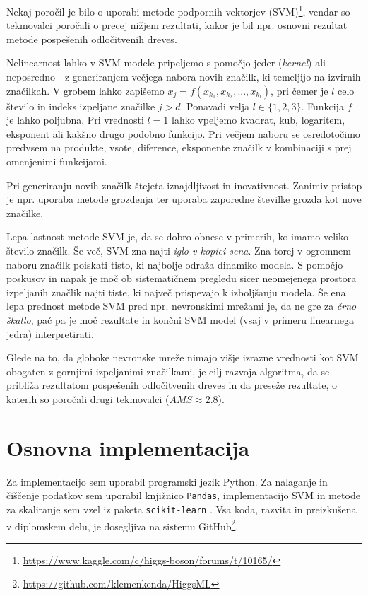 \documentclass[11pt,a4paper,openany]{book}
\begin{document}
Nekaj poročil je bilo o uporabi metode podpornih vektorjev (SVM)\footnote{\url{https://www.kaggle.com/c/higgs-boson/forums/t/10165/}}, vendar so tekmovalci poročali o precej nižjem rezultati, kakor je bil npr. osnovni rezultat metode pospešenih odločitvenih dreves.

Nelinearnost lahko v SVM modele pripeljemo s pomočjo jeder (\textit{kernel}) ali neposredno - z generiranjem večjega nabora novih značilk, ki temeljijo na izvirnih značilkah. V grobem lahko zapišemo $x_j = f(x_{k_1}, x_{k_2}, ..., x_{k_l})$, pri čemer je $l$ celo število in indeks izpeljane značilke $j > d$. Ponavadi velja $l \in \{1, 2, 3\}$. Funkcija $f$ je lahko poljubna. Pri vrednosti $l = 1$ lahko vpeljemo kvadrat, kub, logaritem, eksponent ali kakšno drugo podobno funkcijo. Pri večjem naboru se osredotočimo predvsem na produkte, vsote, diference, eksponente značilk v kombinaciji s prej omenjenimi funkcijami. 

Pri generiranju novih značilk štejeta iznajdljivost in inovativnost. Zanimiv pristop je npr. uporaba metode grozdenja ter uporaba zaporedne številke grozda kot nove značilke.

Lepa lastnost metode SVM je, da se dobro obnese v primerih, ko imamo veliko število značilk. Še več, SVM zna najti \textit{iglo v kopici sena}. Zna torej v ogromnem naboru značilk poiskati tisto, ki najbolje odraža dinamiko modela. S pomočjo poskusov in napak je moč ob sistematičnem pregledu sicer neomejenega prostora izpeljanih značlik najti tiste, ki največ prispevajo k izboljšanju modela. Še ena lepa prednost metode SVM pred npr. nevronskimi mrežami je, da ne gre za \textit{črno škatlo}, pač pa je moč rezultate in končni SVM model (vsaj v primeru linearnega jedra) interpretirati.

Glede na to, da globoke nevronske mreže nimajo višje izrazne vrednosti kot SVM obogaten z gornjimi izpeljanimi značilkami, je cilj razvoja algoritma, da se približa rezultatom pospešenih odločitvenih dreves in da preseže rezultate, o katerih so poročali drugi tekmovalci ($AMS \approx \num{2,8}$).


\section{Osnovna implementacija}
Za implementacijo sem uporabil programski jezik Python. Za nalaganje in čiščenje podatkov sem uporabil knjižnico \texttt{Pandas}, implementacijo SVM in metode za skaliranje sem vzel iz paketa \texttt{scikit-learn} \cite{scikit-learn}. Vsa koda, razvita in preizkušena v diplomskem delu, je dosegljiva na sistemu GitHub\footnote{\url{https://github.com/klemenkenda/HiggsML}}.
\end{document}
